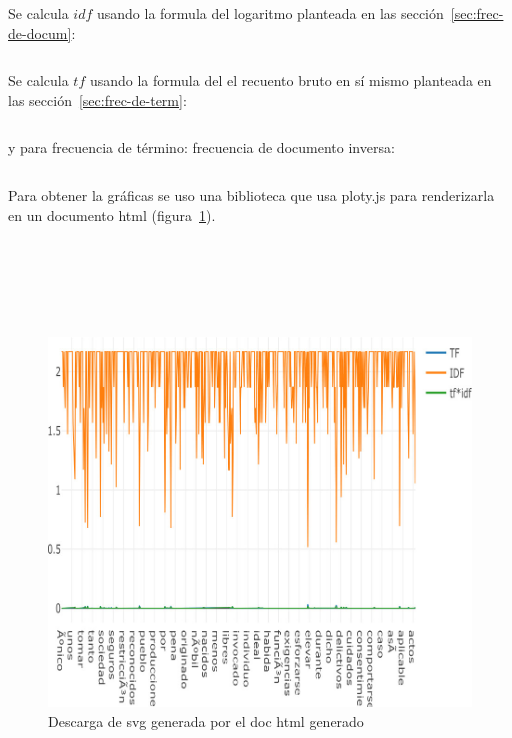 \documentclass{IEEEtran}
\begin{document}
Se calcula $idf$ usando la formula del logaritmo planteada en las
sección~\ref{sec:frec-de-docum}:
\begin{code}
  \inputminted[firstline=45,lastline=49]{elixir}{../lib/corpus.ex}
\end{code}

Se calcula $tf$ usando la formula del  el recuento bruto en sí mismo
planteada en las
sección~\ref{sec:frec-de-term}:
\begin{code}
  \inputminted[firstline=51,lastline=56]{elixir}{../lib/corpus.ex}
\end{code}

y para frecuencia de término: frecuencia de documento inversa:
\begin{code}
  \inputminted[firstline=65,lastline=67]{elixir}{../lib/corpus.ex}
\end{code}

Para obtener la gráficas se uso una biblioteca que usa ploty.js para renderizarla
en un documento html (figura~\ref{fig:1}).
\\\\\\\\\\\\
\begin{figure}[h!]
  \centering
  \includegraphics[width=\linewidth]{./output}
  \caption{Descarga de svg generada por el doc html generado}\label{fig:1}
\end{figure}
\end{document}
